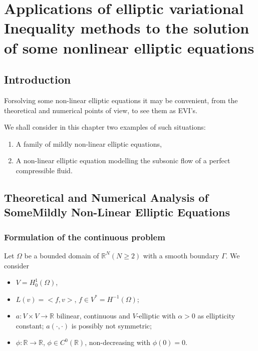 
\chapter[Applications of elliptic variational
  Inequality...]{Applications of elliptic variational Inequality
  methods to the solution of some nonlinear elliptic
  equations}\label{chap4} 

\section{Introduction}\label{c4:s1}

For\pageoriginale  solving some non-linear elliptic equations it may
be convenient, from the theoretical and numerical points of view, to
see them as EVI's. 

We shall consider in this chapter two examples of such situations:
\begin{enumerate}[(1)]
\item A family of mildly non-linear elliptic equations,
\item A non-linear elliptic equation modelling the subsonic flow of a
  perfect  compressible fluid. 
\end{enumerate}

\section[Theoretical and Numerical Analysis of...]{Theoretical and
  Numerical Analysis of Some\hfil\break Mildly Non-Linear Elliptic
  Equations}\label{c4:s2} 

\subsection{Formulation of the  continuous problem}\label{c4:ss2.1}

Let $\Omega$ be a bounded domain of $\mathbb{R}^N (N \geq 2)$ with a smooth boundary $\Gamma$. We consider 
\begin{itemize}
\item $V = H^1_0 (\Omega)$,
\item $L (v) = <f, v>$, $f \in V^* = H^{-1} (\Omega)$;
\item $a : V \times V \to \mathbb{R}$ bilinear, continuous and $V$-elliptic with $\alpha > 0$ as ellipticity constant; $a (\cdot, \cdot)$ is possibly not symmetric; 
\item $\phi : \mathbb{R} \to \mathbb{R}$, $\phi \in C^0 (\mathbb{R})$, non-decreasing with $\phi (0) = 0$.
\end{itemize}

